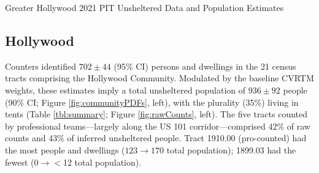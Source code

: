 \documentclass[11pt,twocolumn]{article}
\begin{document}
\begin{table}[t!]
\caption{Greater Hollywood 2021 PIT Unsheltered Data and Population Estimates}
\caption*{Parentheses denote 90\% uncertainties (binomial in the case of the categories). 
Uncertainties larger than estimates imply that only upper limits are available. Marginalized
upper limits are obtainable from the results file and imply $<$3 unaccompanied minors and
$<$3 unsheltered families in either community.}
\label{tbl:summary}
\end{table}


\subsection{Hollywood}
\label{sec:hWood}

Counters identified $702\pm44$ (95\% CI) persons and dwellings in the 21 census tracts 
comprising the Hollywood Community. Modulated by the baseline CVRTM weights, these 
estimates imply a total unsheltered population of $936\pm92$ people 
(90\% CI; Figure \ref{fig:communityPDFs}, left), with the plurality (35\%) living in tents 
(Table \ref{tbl:summary}; Figure \ref{fig:rawCounts}, left). The five tracts counted by professional 
teams---largely along the US 101 corridor---comprised 42\% of raw counts and 43\% of inferred 
unsheltered people. Tract 1910.00 (pro-counted) had the most people and dwellings ($123\rightarrow170$
total population); 1899.03 had the fewest ($0\rightarrow$$<$12 total population). %
\end{document}

